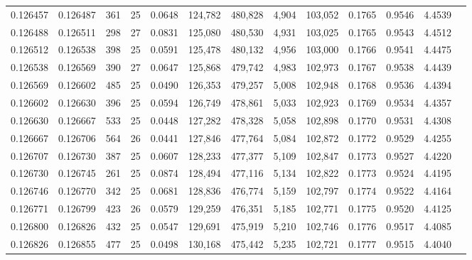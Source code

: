 \begin{tabular}{rrrrrrrrrrrrr}
0.126457 & 0.126487 &   361 &  25 &                                     0.0648 & 124,782 & 480,828 &   4,904 & 103,052 & 0.1765 & 0.9546 & 4.4539 \\
0.126488 & 0.126511 &   298 &  27 &                                     0.0831 & 125,080 & 480,530 &   4,931 & 103,025 & 0.1765 & 0.9543 & 4.4512 \\
0.126512 & 0.126538 &   398 &  25 &                                     0.0591 & 125,478 & 480,132 &   4,956 & 103,000 & 0.1766 & 0.9541 & 4.4475 \\
0.126538 & 0.126569 &   390 &  27 &                                     0.0647 & 125,868 & 479,742 &   4,983 & 102,973 & 0.1767 & 0.9538 & 4.4439 \\
0.126569 & 0.126602 &   485 &  25 &                                     0.0490 & 126,353 & 479,257 &   5,008 & 102,948 & 0.1768 & 0.9536 & 4.4394 \\
0.126602 & 0.126630 &   396 &  25 &                                     0.0594 & 126,749 & 478,861 &   5,033 & 102,923 & 0.1769 & 0.9534 & 4.4357 \\
0.126630 & 0.126667 &   533 &  25 &                                     0.0448 & 127,282 & 478,328 &   5,058 & 102,898 & 0.1770 & 0.9531 & 4.4308 \\
0.126667 & 0.126706 &   564 &  26 &                                     0.0441 & 127,846 & 477,764 &   5,084 & 102,872 & 0.1772 & 0.9529 & 4.4255 \\
0.126707 & 0.126730 &   387 &  25 &                                     0.0607 & 128,233 & 477,377 &   5,109 & 102,847 & 0.1773 & 0.9527 & 4.4220 \\
0.126730 & 0.126745 &   261 &  25 &                                     0.0874 & 128,494 & 477,116 &   5,134 & 102,822 & 0.1773 & 0.9524 & 4.4195 \\
0.126746 & 0.126770 &   342 &  25 &                                     0.0681 & 128,836 & 476,774 &   5,159 & 102,797 & 0.1774 & 0.9522 & 4.4164 \\
0.126771 & 0.126799 &   423 &  26 &                                     0.0579 & 129,259 & 476,351 &   5,185 & 102,771 & 0.1775 & 0.9520 & 4.4125 \\
0.126800 & 0.126826 &   432 &  25 &                                     0.0547 & 129,691 & 475,919 &   5,210 & 102,746 & 0.1776 & 0.9517 & 4.4085 \\
0.126826 & 0.126855 &   477 &  25 &                                     0.0498 & 130,168 & 475,442 &   5,235 & 102,721 & 0.1777 & 0.9515 & 4.4040 \\

\end{tabular}
